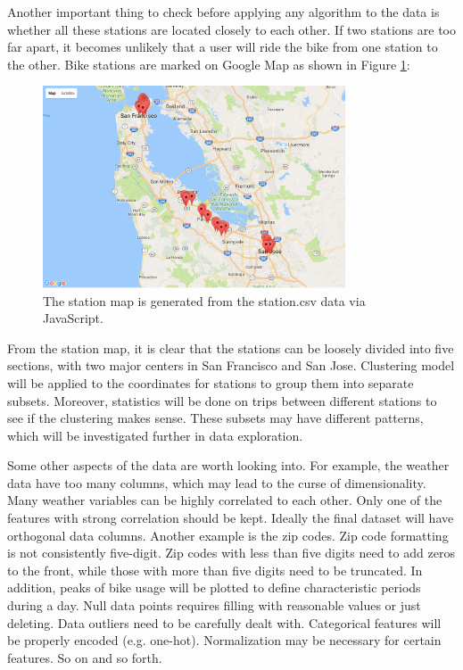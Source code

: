 \documentclass[a4paper]{article}
\begin{document}
	Another important thing to check before applying any algorithm to the data is whether all these stations are located closely to each other. If two stations are too far apart, it becomes unlikely that a user will ride the bike from one station to the other. Bike stations are marked on Google Map as shown in Figure \ref{fig:map}:
	
	\begin{figure}
		\centering
		\includegraphics[width=0.8\textwidth]{Station_Map.png}
		\caption{\label{fig:map}The station map is generated from the station.csv data via JavaScript.}
	\end{figure}
	
	From the station map, it is clear that the stations can be loosely divided into five sections, with two major centers in San Francisco and San Jose. Clustering model will be applied to the coordinates for stations to group them into separate subsets. Moreover, statistics will be done on trips between different stations to see if the clustering makes sense. These subsets may have different patterns, which will be investigated further in data exploration.
	
	Some other aspects of the data are worth looking into. For example, the weather data have too many columns, which may lead to the curse of dimensionality. Many weather variables can be highly correlated to each other. Only one of the features with strong correlation should be kept. Ideally the final dataset will have orthogonal data columns. Another example is the zip codes. Zip code formatting is not consistently five-digit. Zip codes with less than five digits need to add zeros to the front, while those with more than five digits need to be truncated. In addition, peaks of bike usage will be plotted to define characteristic periods during a day. Null data points requires filling with reasonable values or just deleting. Data outliers need to be carefully dealt with. Categorical features will be properly encoded (e.g. one-hot). Normalization may be necessary for certain features. So on and so forth.
	
\end{document}
